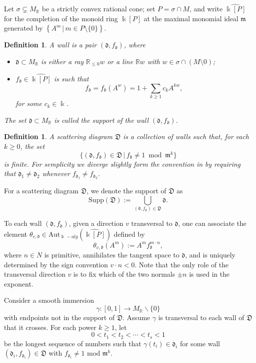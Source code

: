 \documentclass[11pt]{amsart}
\newtheorem{defn}[theorem]{Definition}
\theoremstyle{remark}
\numberwithin{equation}{section}
\newcommand{\RR}{\mathbb{R}}
\newcommand{\fd}{\mathfrak{d}}
\newcommand{\fD}{\mathfrak{D}}
\newcommand{\fm}{\mathfrak{m}}
\begin{document}
Let $\sigma \subsetneq M_{\RR}$ be a strictly convex rational cone; set
$P=\sigma \cap M$, and write $\widehat{\Bbbk[P]}$ for the completion of the
monoid ring $\Bbbk[P]$ at the maximal monomial ideal $\fm$ generated by
$\left\{A^m \,|\, m\in P\setminus\{0\}\right\}$.

\begin{defn}
  \label{walldef}
  A \emph{wall} is a pair $(\fd, f_{\fd})$, where 
  \begin{itemize}

    \item 
      $\fd \subset M_{\mathbb{R}}$ is either a ray $\RR_{\le 0} w$ or a line
      $\RR w$ with $w\in \sigma \cap(M\setminus 0)$;

    \item 
      $f_{\fd} \in \widehat{\Bbbk [P]}$ is such that 
      \[ 
        f_{\fd} = f_{\fd}(A^w) = 1 + \sum_{k\geq 1} c_k A^{k w},
      \] 
      for some $c_k \in \Bbbk$. 
  \end{itemize}
  The set $\fd \subset M_{\mathbb{R}}$ is called the \emph{support} of the wall
  $(\fd, f_{\fd})$.
\end{defn}

\begin{defn}
  \label{def:scattering_diagram}
  A scattering diagram $\fD$ is a collection of walls such that, for each $k \geq
  0$, the set
  \[
    \{ (\fd, f_{\fd}) \in \fD\, |\, f_{\fd} \neq 1 \bmod \fm^k \}
  \]
  is finite. For semplicity we diverge slightly form the convention in
  \cite{GHKK} by requiring that $\fd_1 \neq \fd_2$ whenever $f_{\fd_1}\neq
  f_{\fd_2}$.
\end{defn}

For a scattering diagram $\fD$, we denote the support of $\fD$ as
\[
  \text{Supp} (\fD) := \bigcup_{(\fd, f_{\fd}) \in \fD} \fd. 
\]

To each wall $(\fd, f_{\fd})$, given a direction $v$ transversal to $\fd$, one
can associate the element $\theta_{v,\fd}\in
{\mathrm{Aut}}_{\Bbbk-alg}\left(\widehat{\Bbbk[P]}\right)$ defined by
\[
  \theta_{v,\fd} (A^m) := A^m f_{\fd}^{m\cdot n }, 
\]
where $n\in N$ is primitive, annihilates the tangent space to $\fd$, and is
uniquely determined by the sign convention $ v\cdot n <0$.  Note
that the only role of the transversal direction $v$ is to fix which of the two
normals $\pm n$ is used in the exponent. 

Consider a smooth immersion
\[  
  \gamma: [0,1] \rightarrow M_{\mathbb{R}} \backslash  \{0 \}  
\]
with endpoints not in the support of $\fD$. Assume $\gamma$ is transversal to
each wall of $\fD$ that it crosses. For each power $k \geq 1$, let  
\[
  0< t_1 <  t_2 < \cdots < t_s < 1 
\]
be the longest sequence of numbers such that $\gamma(t_i)\in\fd_i$ for some wall
$(\fd_i,f_{\fd_i}) \in \fD$ with $f_{\fd_i} \neq 1 \text{ mod } \fm^k$.
\end{document}
